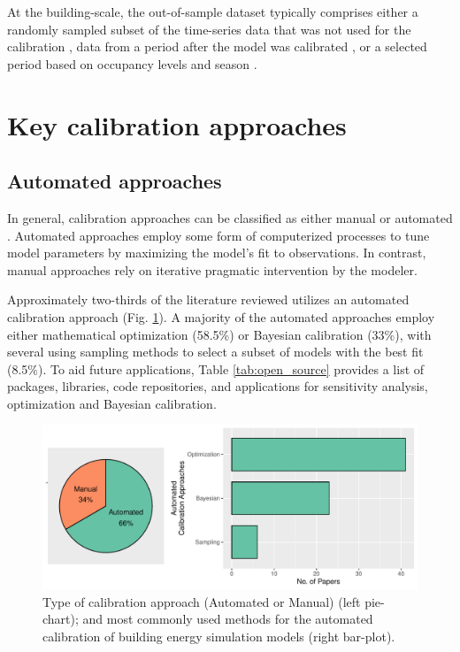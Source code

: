 \documentclass[review]{elsarticle}
\begin{document}
At the building-scale, the out-of-sample dataset typically comprises either a randomly sampled subset of the time-series data that was not used for the calibration \cite{chong2017bayesian, chong2018guidelines}, data from a period after the model was calibrated \cite{yuan2017simultaneous, yin2016linking, li2016assessment, chen2019meta, manfren2020parametric, yang2015model}, or a selected period based on occupancy levels and season \cite{odonovan2019predicting}. 


\section{Key calibration approaches}

\subsection{Automated approaches}

In general, calibration approaches can be classified as either manual or automated \cite{coakley2014review}. Automated approaches employ some form of computerized processes to tune model parameters by maximizing the model's fit to observations. In contrast, manual approaches rely on iterative pragmatic intervention by the modeler. 

Approximately two-thirds of the literature reviewed utilizes an automated calibration approach (Fig. \ref{fig:auto_manual}). A majority of the automated approaches employ either mathematical optimization (58.5\%) or Bayesian calibration (33\%), with several using sampling methods to select a subset of models with the best fit (8.5\%). To aid future applications, Table \ref{tab:open_source} provides a list of packages, libraries, code repositories, and applications for sensitivity analysis, optimization and Bayesian calibration. 

\begin{figure}[!h]
\centering
\includegraphics[width=\textwidth]{figures/auto_manual.pdf}
\caption{Type of calibration approach (Automated or Manual) (left pie-chart); and most commonly used methods for the automated calibration of building energy simulation models (right bar-plot).}
\label{fig:auto_manual}
\end{figure}
\end{document}
